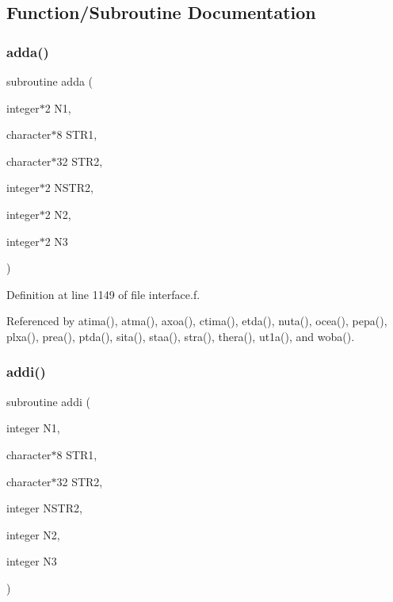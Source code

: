 \subsection{Function/\+Subroutine Documentation}
\mbox{\label{interface_8f_a06e06b83a933855a258c22bdff0d38dc}} 
\subsubsection{\texorpdfstring{adda()}{adda()}}
{\footnotesize\ttfamily subroutine adda (\begin{DoxyParamCaption}\item[{integer$\ast$2}]{N1,  }\item[{character$\ast$8}]{S\+T\+R1,  }\item[{character$\ast$32}]{S\+T\+R2,  }\item[{integer$\ast$2}]{N\+S\+T\+R2,  }\item[{integer$\ast$2}]{N2,  }\item[{integer$\ast$2}]{N3 }\end{DoxyParamCaption})}



Definition at line 1149 of file interface.\+f.



Referenced by atima(), atma(), axoa(), ctima(), etda(), nuta(), ocea(), pepa(), plxa(), prea(), ptda(), sita(), staa(), stra(), thera(), ut1a(), and woba().

\mbox{\label{interface_8f_ae6231d12a4386a2dd80ae35f21fdde1a}} 
\subsubsection{\texorpdfstring{addi()}{addi()}}
{\footnotesize\ttfamily subroutine addi (\begin{DoxyParamCaption}\item[{integer}]{N1,  }\item[{character$\ast$8}]{S\+T\+R1,  }\item[{character$\ast$32}]{S\+T\+R2,  }\item[{integer}]{N\+S\+T\+R2,  }\item[{integer}]{N2,  }\item[{integer}]{N3 }\end{DoxyParamCaption})}



